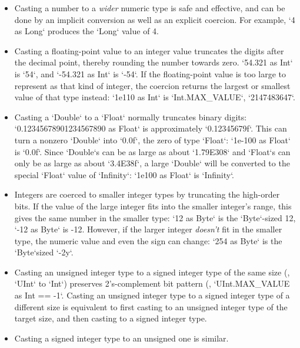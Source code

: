 \begin{itemize}
\item Casting a number to a {\em wider} numeric type is safe and effective,
      and can be done by an implicit conversion as well as an explicit
      coercion.  For example, \xcd`4 as Long` produces the \xcd`Long` value of
      4. 
\item Casting a floating-point value to an integer value truncates the digits
      after the decimal point, thereby rounding the number towards zero.  
      \xcd`54.321 as Int` is \xcd`54`, and 
      \xcd`-54.321 as Int` is \xcd`-54`.
      If the floating-point value is too large to represent as that kind of
      integer, the coercion returns the largest or smallest value of that type
      instead: \xcd`1e110 as Int` is 
      \xcd`Int.MAX_VALUE`, \viz{} \xcd`2147483647`. 

\item Casting a \xcd`Double` to a \xcd`Float` normally truncates binary digits: 
      \xcd`0.12345678901234567890 as Float` is approximately \xcd`0.12345679f`.  This can
      turn a nonzero \xcd`Double` into \xcd`0.0f`, the zero of type
      \xcd`Float`: 
      \xcd`1e-100 as Float` is \xcd`0.0f`.  Since 
      \xcd`Double`s can be as large as about \xcd`1.79E308` and \xcd`Float`s
      can only be as large as about \xcd`3.4E38f`, a large \xcd`Double` will
      be converted to the special \xcd`Float` value of \xcd`Infinity`: 
      \xcd`1e100 as Float` is \xcd`Infinity`.
\item Integers are coerced to smaller integer types by truncating the
      high-order bits. If the value of the large integer fits into the smaller
      integer's range, this gives the same number in the smaller type: 
      \xcd`12 as Byte` is the \xcd`Byte`-sized 12, 
      \xcd`-12 as Byte` is -12. 
      However, if the larger integer {\em doesn't} fit in the smaller type,
      the numeric value and even the sign can change: \xcd`254 as Byte` is
      the \xcd`Byte`sized \xcd`-2y`.  

\item Casting an unsigned integer type to a signed integer type of the same
      size (\eg, \xcd`UInt` to \xcd`Int`) preserves 2's-complement bit pattern
      (\eg,  
      \xcd`UInt.MAX_VALUE as Int == -1`.   Casting an unsigned integer type to
      a signed integer type of a different size is equivalent to first casting
      to an unsigned integer type of the target size, and then casting to a
      signed integer type.

\item Casting a signed integer type to an unsigned one is similar.  

\end{itemize}

